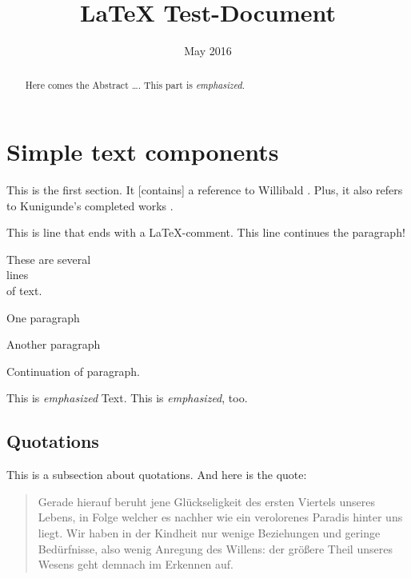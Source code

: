 \documentclass[12pt, english, a4paper]{article}
\begin{document}
\title{LaTeX Test-Document}

\date{May 2016}
 
\maketitle

\begin{abstract}
Here comes the Abstract \ldots. This part is {\em emphasized}.
\end{abstract}

\newpage

\tableofcontents

\section{Simple text components}

This is the first section. It [contains] a reference to
Willibald \citet[32]{Willibald2015}. Plus, it also refers to
Kunigunde's completed works \citep{Kunigunde2010}.

This is line that ends with a LaTeX-comment. %
This line continues the paragraph!

These are several \\
lines \\
of text.

One paragraph

Another paragraph


Continuation of paragraph.

This is {\em emphasized} Text. This is \emph{emphasized}, too.

\subsection{Quotations}

This is a subsection about quotations. And here is the quote:

\begin{quote}
    Gerade hierauf beruht jene Glückseligkeit des ersten Viertels unseres Lebens,
    in Folge welcher es nachher wie ein verolorenes Paradis hinter uns liegt.
    Wir haben in der Kindheit nur wenige Beziehungen und geringe Bedürfnisse, also wenig
    Anregung des Willens: der größere Theil unseres Wesens geht demnach im Erkennen auf.
    \cite[199]{Schopenhauer1851}
\end{quote}
\end{document}
